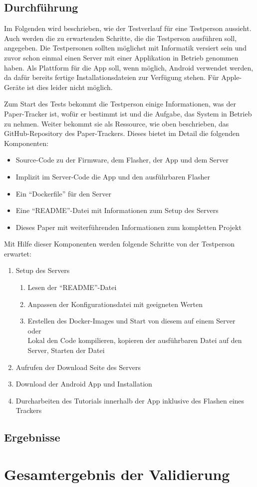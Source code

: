 \subsection{Durchführung}
Im Folgenden wird beschrieben, wie der Testverlauf für eine Testperson aussieht.
Auch werden die zu erwartenden Schritte, die die Testperson ausführen soll, angegeben.
Die Testpersonen sollten möglichst mit Informatik versiert sein und zuvor schon einmal einen Server mit einer
Applikation in Betrieb genommen haben.
Als Plattform für die App soll, wenn möglich, Android verwendet werden, da dafür bereits fertige Installationsdateien
zur Verfügung stehen.
Für Apple-Geräte ist dies leider nicht möglich.

Zum Start des Tests bekommt die Testperson einige Informationen, was der Paper-Tracker ist, wofür er bestimmt ist
und die Aufgabe, das System in Betrieb zu nehmen.
Weiter bekommt sie als Ressource, wie oben beschrieben, das GitHub-Repository des Paper-Trackers.
Dieses bietet im Detail die folgenden Komponenten:
\begin{itemize}
	\item Source-Code zu der Firmware, dem Flasher, der App und dem Server
	\item Implizit im Server-Code die App und den ausführbaren Flasher
	\item Ein \enquote{Dockerfile} für den Server
	\item Eine \enquote{README}-Datei mit Informationen zum Setup des Servers
	\item Dieses Paper mit weiterführenden Informationen zum kompletten Projekt
\end{itemize}

Mit Hilfe dieser Komponenten werden folgende Schritte von der Testperson erwartet:
\begin{enumerate}
	\item Setup des Servers
	\begin{enumerate}
		\item Lesen der \enquote{README}-Datei
		\item Anpassen der Konfigurationsdatei mit geeigneten Werten
		\item Erstellen des Docker-Images und Start von diesem auf einem Server \hfill \\
			\hspace*{20mm} oder \hfill \\
			Lokal den Code kompilieren, kopieren der ausführbaren Datei auf den Server, Starten der Datei
	\end{enumerate}
	\item Aufrufen der Download Seite des Servers
	\item Download der Android App und Installation
	\item Durcharbeiten des Tutorials innerhalb der App inklusive des Flashen eines Trackers
\end{enumerate}

\subsection{Ergebnisse}

\section{Gesamtergebnis der Validierung}

